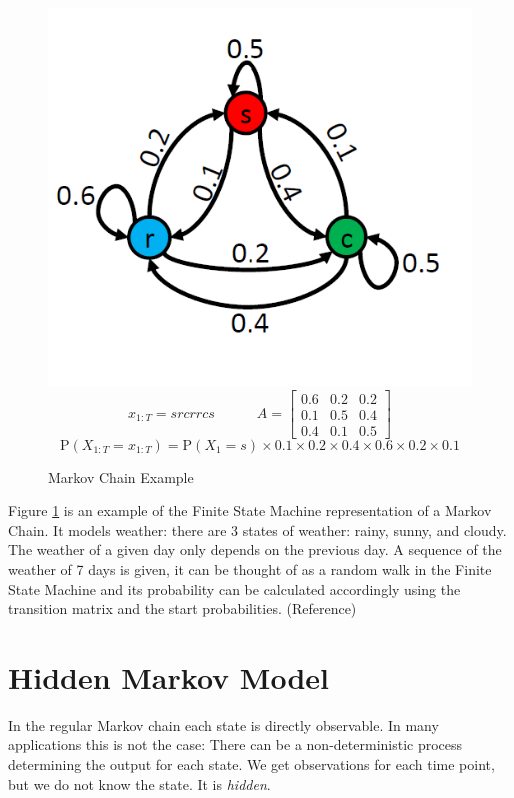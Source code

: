 \begin{figure}
    \centering
   \includegraphics{figures/markov-chain.png}
$$x_{1: T}=s r  c r r c s \quad\quad\quad A= \left[\begin{array}{lll}
0.6 & 0.2 & 0.2 \\
0.1 & 0.5 & 0.4 \\
0.4 & 0.1 & 0.5
\end{array}\right]$$
$$\mathrm{P}\left(X_{1: T}=x_{1: T}\right)=\mathrm{P}\left(X_{1}=s\right) \times 0.1 \times 0.2 \times 0.4 \times 0.6 \times 0.2 \times 0.1$$
\caption{Markov Chain Example}    
\label{fig:markov-chain-example}
\end{figure}

Figure \ref{fig:markov-chain-example} is an example of the Finite State Machine representation of a Markov Chain. It models weather: there are 3 states of weather: rainy, sunny, and cloudy. The weather of a given day only depends on the previous day. A sequence of the weather of 7 days is given, it can be thought of as a random walk in the Finite State Machine and its probability can be calculated accordingly using the transition matrix and the start probabilities. (Reference)

\section{Hidden Markov Model}

In the regular Markov chain each state is directly observable. In many applications this is not the case: There can be a non-deterministic process determining the output for each state. We get observations for each time point, but we do not know the state. It is \emph{hidden}. 


